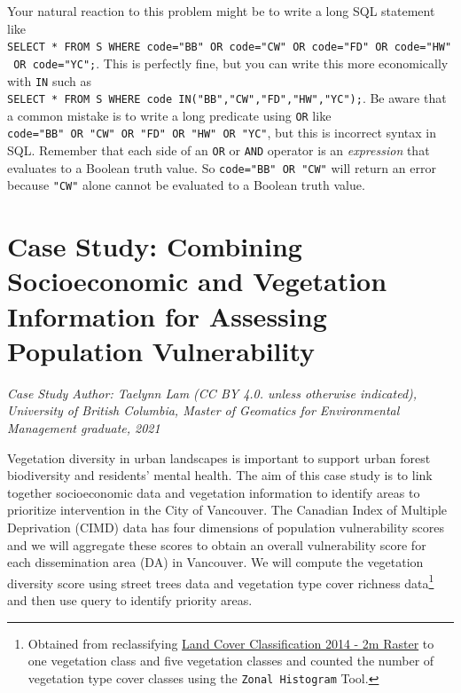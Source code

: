 \documentclass[
]{book}
\begin{document}
Your natural reaction to this problem might be to write a long SQL statement like \texttt{SELECT\ *\ FROM\ S\ WHERE\ code="BB"\ OR\ code="CW"\ OR\ code="FD"\ OR\ code="HW"\ OR\ code="YC";}. This is perfectly fine, but you can write this more economically with \texttt{IN} such as \texttt{SELECT\ *\ FROM\ S\ WHERE\ code\ IN("BB","CW","FD","HW","YC");}. Be aware that a common mistake is to write a long predicate using \texttt{OR} like \texttt{code="BB"\ OR\ "CW"\ OR\ "FD"\ OR\ "HW"\ OR\ "YC"}, but this is incorrect syntax in SQL. Remember that each side of an \texttt{OR} or \texttt{AND} operator is an \emph{expression} that evaluates to a Boolean truth value. So \texttt{code="BB"\ OR\ "CW"} will return an error because \texttt{"CW"} alone cannot be evaluated to a Boolean truth value.

\hypertarget{case-study-combining-socioeconomic-and-vegetation-information-for-assessing-population-vulnerability}{%
\section{Case Study: Combining Socioeconomic and Vegetation Information for Assessing Population Vulnerability}\label{case-study-combining-socioeconomic-and-vegetation-information-for-assessing-population-vulnerability}}

\emph{Case Study Author: Taelynn Lam (CC BY 4.0. unless otherwise indicated), University of British Columbia, Master of Geomatics for Environmental Management graduate, 2021}

Vegetation diversity in urban landscapes is important to support urban forest biodiversity and residents' mental health. The aim of this case study is to link together socioeconomic data and vegetation information to identify areas to prioritize intervention in the City of Vancouver. The Canadian Index of Multiple Deprivation (CIMD) \citep{statistics_canada_canadian_2019} data has four dimensions of population vulnerability scores and we will aggregate these scores to obtain an overall vulnerability score for each dissemination area (DA) in Vancouver. We will compute the vegetation diversity score using street trees data \citep{city_of_vancouver_street_2012} and vegetation type cover richness data\footnote{Obtained from reclassifying \href{http://www.metrovancouver.org/data}{Land Cover Classification 2014 - 2m Raster} to one vegetation class and five vegetation classes and counted the number of vegetation type cover classes using the \texttt{Zonal\ Histogram} Tool.} and then use query to identify priority areas.
\end{document}
